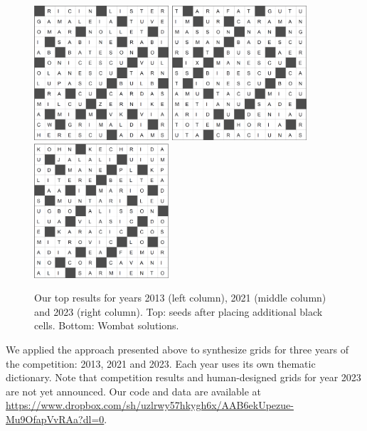 \begin{figure}[th]
\vspace{0.25cm}

\includegraphics[height=5cm]{_empiricalSupport/_originalSubmission/y-2013/results/_runWombat/2013b.png}
%
\hspace{1cm}
%
\includegraphics[height=5cm]{_empiricalSupport/_originalSubmission/y-2021/results/_runWombat/2021b.png}
%
\hspace{1cm}
%
\includegraphics[height=5cm]{_empiricalSupport/_originalSubmission/y-2023/results/_runWombat/2023b.png}

\caption{Our top results for years 2013 (left column), 2021 (middle column) and 2023 (right column). Top: seeds after placing additional black cells. Bottom: {\sc Wombat} solutions.}
\label{fig:results}
\end{figure}

We applied the approach presented above to synthesize grids for three years of the competition: 2013, 2021 and 2023. Each year uses its own thematic dictionary. Note that competition results and human-designed grids for year 2023 are not yet announced. Our code and data are available at \url{https://www.dropbox.com/sh/uzlrwy57hkygh6x/AAB6ekUpezue-Mu9OfapVvRAa?dl=0}.


